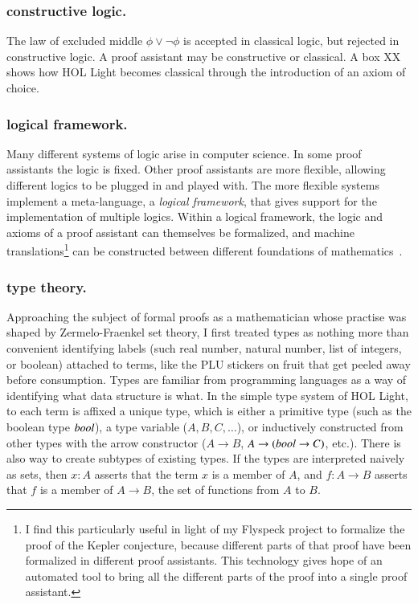 \documentclass{llncs}
\def\op#1{{\hbox{#1}}}
\begin{document}
\subsubsection{constructive logic.} The
law of excluded middle $\phi\lor\lnot \phi$ is accepted in classical
logic, but rejected in constructive logic.  A proof assistant
may be constructive or classical.  A box XX shows how HOL Light becomes
classical through the introduction of an axiom of choice.

\subsubsection{logical framework.} 
Many different systems of logic arise in computer science.  In some
proof assistants the logic is fixed. Other proof assistants are more
flexible, allowing different logics to be plugged in and played with.
The more flexible systems implement a meta-language, a {\it logical
  framework}, that gives support for the implementation of multiple
logics.  Within a logical framework,
the logic and axioms of a proof assistant can themselves be formalized,
and machine translations\footnote{I find this particularly useful in
  light of my Flyspeck project to formalize the proof of the Kepler
  conjecture, because different parts of that proof have been
  formalized in different proof assistants.  This technology gives
  hope of an automated tool to bring all the different parts of the
  proof into a single proof assistant.} can be constructed between
different foundations of mathematics~\cite{IRFF}.

\subsubsection{type theory.}

Approaching the subject of formal proofs as a mathematician whose
practise was shaped by Zermelo-Fraenkel set theory, I first treated
types as nothing more than convenient identifying labels (such real
number, natural number, list of integers, or boolean) attached to terms,
like the 
PLU stickers on fruit that get peeled
away before consumption.  Types are familiar from programming
languages as a way of identifying what data structure is what.  In the
simple type system of HOL Light, to each term is affixed a unique
type, which is either a primitive type (such as the boolean type
$\op{\it bool}$), a type variable ($A,B,C,\ldots$), or inductively
constructed from other types with the arrow constructor
($A\rightarrow B$, $A\rightarrow (\op{\it bool} \rightarrow C)$,
etc.).  There is also way to create subtypes of existing types.
If the types are interpreted naively as sets, then $x:A$
asserts that the term $x$ is a member of $A$, and $f:A\rightarrow B$
asserts that $f$ is a member of $A\rightarrow B$, the set of functions
from $A$ to $B$.
\end{document}
